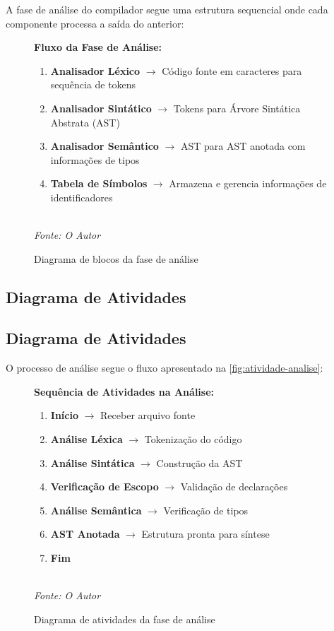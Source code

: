 \documentclass[
	12pt,				%
	oneside,
	a4paper,			%
	english,			%
	french,				%
	spanish,			%
	brazil,				%
	]{abntex2}
\begin{document}
A fase de análise do compilador segue uma estrutura sequencial onde cada componente processa a saída do anterior:

\begin{figure}[H]
\centering
\caption{Diagrama de blocos da fase de análise}
\label{fig:diagrama-analise}
\begin{minipage}{0.8\textwidth}
\textbf{Fluxo da Fase de Análise:}
\begin{enumerate}
    \item \textbf{Analisador Léxico} $\rightarrow$ Código fonte em caracteres para sequência de tokens
    \item \textbf{Analisador Sintático} $\rightarrow$ Tokens para Árvore Sintática Abstrata (AST)
    \item \textbf{Analisador Semântico} $\rightarrow$ AST para AST anotada com informações de tipos
    \item \textbf{Tabela de Símbolos} $\rightarrow$ Armazena e gerencia informações de identificadores
\end{enumerate}
\end{minipage}
\\
\textit{Fonte: O Autor}
\end{figure}

\subsection{Diagrama de Atividades}

\subsection{Diagrama de Atividades}

O processo de análise segue o fluxo apresentado na \autoref{fig:atividade-analise}:

\begin{figure}[H]
\centering
\caption{Diagrama de atividades da fase de análise}
\label{fig:atividade-analise}
\begin{minipage}{0.7\textwidth}
\textbf{Sequência de Atividades na Análise:}
\begin{enumerate}
    \item \textbf{Início} $\rightarrow$ Receber arquivo fonte
    \item \textbf{Análise Léxica} $\rightarrow$ Tokenização do código
    \item \textbf{Análise Sintática} $\rightarrow$ Construção da AST
    \item \textbf{Verificação de Escopo} $\rightarrow$ Validação de declarações
    \item \textbf{Análise Semântica} $\rightarrow$ Verificação de tipos
    \item \textbf{AST Anotada} $\rightarrow$ Estrutura pronta para síntese
    \item \textbf{Fim}
\end{enumerate}
\end{minipage}
\\
\textit{Fonte: O Autor}
\end{figure}
\end{document}
